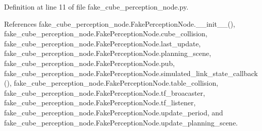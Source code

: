 Definition at line 11 of file fake\+\_\+cube\+\_\+perception\+\_\+node.\+py.



References fake\+\_\+cube\+\_\+perception\+\_\+node.\+Fake\+Perception\+Node.\+\_\+\+\_\+init\+\_\+\+\_\+(), fake\+\_\+cube\+\_\+perception\+\_\+node.\+Fake\+Perception\+Node.\+cube\+\_\+collision, fake\+\_\+cube\+\_\+perception\+\_\+node.\+Fake\+Perception\+Node.\+last\+\_\+update, fake\+\_\+cube\+\_\+perception\+\_\+node.\+Fake\+Perception\+Node.\+planning\+\_\+scene, fake\+\_\+cube\+\_\+perception\+\_\+node.\+Fake\+Perception\+Node.\+pub, fake\+\_\+cube\+\_\+perception\+\_\+node.\+Fake\+Perception\+Node.\+simulated\+\_\+link\+\_\+state\+\_\+callback(), fake\+\_\+cube\+\_\+perception\+\_\+node.\+Fake\+Perception\+Node.\+table\+\_\+collision, fake\+\_\+cube\+\_\+perception\+\_\+node.\+Fake\+Perception\+Node.\+tf\+\_\+broacaster, fake\+\_\+cube\+\_\+perception\+\_\+node.\+Fake\+Perception\+Node.\+tf\+\_\+listener, fake\+\_\+cube\+\_\+perception\+\_\+node.\+Fake\+Perception\+Node.\+update\+\_\+period, and fake\+\_\+cube\+\_\+perception\+\_\+node.\+Fake\+Perception\+Node.\+update\+\_\+planning\+\_\+scene.


